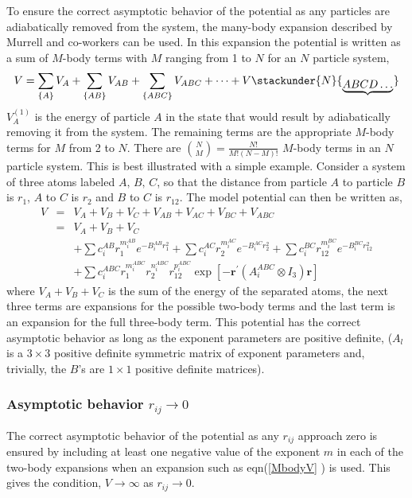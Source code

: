 \documentclass[12pt,thmsa]{article}
\begin{document}
To ensure the correct asymptotic behavior of the potential as any particles
are adiabatically removed from the system, the many-body expansion described
by Murrell and co-workers\cite{Murrell84} can be used. In this expansion the
potential is written as a sum of $M$-body terms with $M$ ranging from 1 to $N
$ for an $N$ particle system, 
\begin{equation}
V=\sum_{\left\{ A\right\} }V_A+\sum_{\left\{ AB\right\}
}V_{AB}+\sum_{\left\{ ABC\right\} }V_{ABC}+\cdots +V\stackunder{N}{_{%
\underbrace{ABCD\ldots }}}
\end{equation}
$V_A^{\left( 1\right) }$ is the energy of particle $A$ in the state that
would result by adiabatically removing it from the system. The remaining
terms are the appropriate $M$-body terms for $M$ from 2 to $N$. There are $%
\binom NM=\frac{N!}{M!\left( N-M\right) !}$ $M$-body terms in an $N$
particle system. This is best illustrated with a simple example. Consider a
system of three atoms labeled $A,\,B,\,C$, so that the distance from
particle $A$ to particle $B$ is $r_1$, $A$ to $C$ is $r_2$ and $B$ to $C$ is 
$r_{12}$. The model potential can then be written as, 
\begin{eqnarray}
V &=&V_A+V_B+V_C+V_{AB}+V_{AC}+V_{BC}+V_{ABC}  \nonumber \\
&=&V_A+V_B+V_C  \nonumber \\
&&+\sum c_i^{AB}r_1^{m_i^{AB}}e^{-B_i^{AB}r_1^2}+\sum
c_i^{AC}r_2^{m_i^{AC}}e^{-B_i^{AC}r_2^2}+\sum
c_i^{BC}r_{12}^{m_i^{BC}}e^{-B_i^{BC}r_{12}^2}  \nonumber \\
&&+\sum c_i^{ABC}r_1^{m_i^{ABC}}r_2^{n_i^{ABC}}r_{12}^{p_i^{ABC}}\exp \left[
-\mathbf{r}^{\prime }\left( A_i^{ABC}\otimes I_3\right) \mathbf{r}\right] 
\label{MbodyV}
\end{eqnarray}
where $V_A+V_B+V_C$ is the sum of the energy of the separated atoms, the
next three terms are expansions for the possible two-body terms and the last
term is an expansion for the full three-body term. This potential has the
correct asymptotic behavior as long as the exponent parameters are positive
definite, ($A_l$ is a $3\times 3$ positive definite symmetric matrix of
exponent parameters and, trivially, the $B$'s are $1\times 1$ positive
definite matrices).

\subsubsection{Asymptotic behavior $r_{ij}\rightarrow 0$}

The correct asymptotic behavior of the potential as any $r_{ij}$ approach
zero is ensured by including at least one negative value of the exponent $m$
in each of the two-body expansions when an expansion such as eqn(\ref{MbodyV}%
) is used. This gives the condition, $V\rightarrow \infty $ as $%
r_{ij}\rightarrow 0.$
\end{document}
